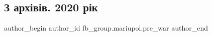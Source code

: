  
 
 
 
 

\subsection{З архівів. 2020 рік}
\label{sec:10_02_2023.fb.fb_group.mariupol.pre_war.1.z_arkh_v_v__2020_r_k}

\ifcmt
 author_begin
   author_id fb_group.mariupol.pre_war
 author_end
\fi
